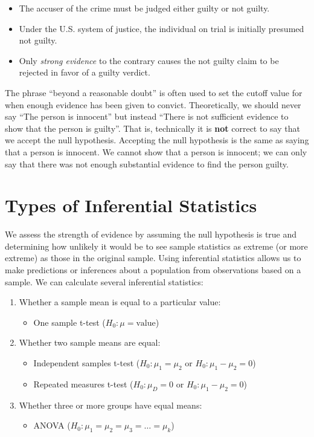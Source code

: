 \documentclass[]{book}
\providecommand{\tightlist}{%
  \setlength{\itemsep}{0pt}\setlength{\parskip}{0pt}}
\begin{document}
\begin{itemize}
\tightlist
\item
  The accuser of the crime must be judged either guilty or not guilty.
\item
  Under the U.S. system of justice, the individual on trial is initially presumed not guilty.
\item
  Only \emph{strong evidence} to the contrary causes the not guilty claim to be rejected in favor of a guilty verdict.
\end{itemize}

The phrase ``beyond a reasonable doubt'' is often used to set the cutoff value for when enough evidence has been given to convict. Theoretically, we should never say ``The person is innocent'' but instead ``There is not sufficient evidence to show that the person is guilty''. That is, technically it is \textbf{not} correct to say that we accept the null hypothesis. Accepting the null hypothesis is the same as saying that a person is innocent. We cannot show that a person is innocent; we can only say that there was not enough substantial evidence to find the person guilty.

\hypertarget{types-of-inferential-statistics}{%
\section{Types of Inferential Statistics}\label{types-of-inferential-statistics}}

We assess the strength of evidence by assuming the null hypothesis is true and determining how unlikely it would be to see sample statistics as extreme (or more extreme) as those in the original sample. Using inferential statistics allows us to make predictions or inferences about a population from observations based on a sample. We can calculate several inferential statistics:

\begin{enumerate}
\def\labelenumi{\arabic{enumi}.}
\tightlist
\item
  Whether a sample mean is equal to a particular value:

  \begin{itemize}
  \tightlist
  \item
    One sample t-test (\(H_0: \mu=\text{value}\))
  \end{itemize}
\item
  Whether two sample means are equal:

  \begin{itemize}
  \tightlist
  \item
    Independent samples t-test (\(H_0: \mu_1=\mu_2\) or \(H_0: \mu_1-\mu_2=0\))
  \item
    Repeated measures t-test (\(H_0: \mu_D=0\) or \(H_0: \mu_1-\mu_2=0\))
  \end{itemize}
\item
  Whether three or more groups have equal means:

  \begin{itemize}
  \tightlist
  \item
    ANOVA (\(H_0: \mu_1=\mu_2=\mu_3=\dots=\mu_k\))
  \end{itemize}
\end{enumerate}
\end{document}
